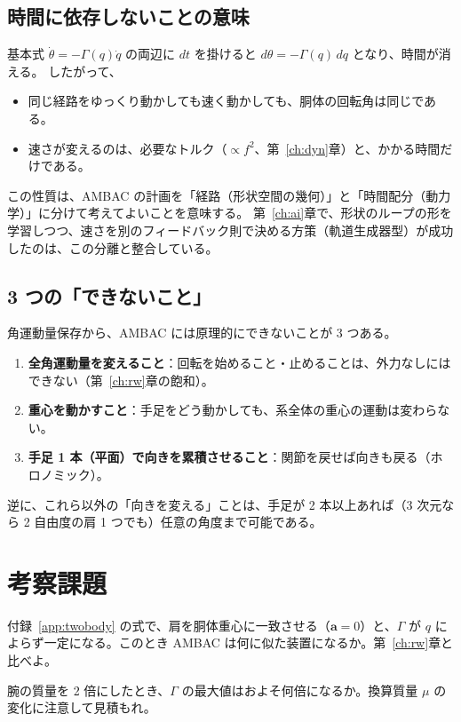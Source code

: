 \subsection{時間に依存しないことの意味}

基本式 $\dot\theta=-\Gamma(q)\dot q$ の両辺に $dt$ を掛けると $d\theta=-\Gamma(q)\,dq$ となり、時間が消える。
したがって、
\begin{itemize}
\item 同じ経路をゆっくり動かしても速く動かしても、胴体の回転角は同じである。
\item 速さが変えるのは、必要なトルク（$\propto f^2$、第~\ref{ch:dyn}章）と、かかる時間だけである。
\end{itemize}
この性質は、AMBAC の計画を「経路（形状空間の幾何）」と「時間配分（動力学）」に分けて考えてよいことを意味する。
第~\ref{ch:ai}章で、形状のループの形を学習しつつ、速さを別のフィードバック則で決める方策（軌道生成器型）が成功したのは、この分離と整合している。

\subsection{3 つの「できないこと」}

角運動量保存から、AMBAC には原理的にできないことが 3 つある。
\begin{enumerate}
\item \textbf{全角運動量を変えること}：回転を始めること・止めることは、外力なしにはできない（第~\ref{ch:rw}章の飽和）。
\item \textbf{重心を動かすこと}：手足をどう動かしても、系全体の重心の運動は変わらない。
\item \textbf{手足 1 本（平面）で向きを累積させること}：関節を戻せば向きも戻る（ホロノミック）。
\end{enumerate}
逆に、これら以外の「向きを変える」ことは、手足が 2 本以上あれば（3 次元なら 2 自由度の肩 1 つでも）任意の角度まで可能である。

\section*{考察課題}
\begin{exercise}
付録~\ref{app:twobody} の式で、肩を胴体重心に一致させる（$\bm a=0$）と、$\Gamma$ が $q$ によらず一定になる。このとき AMBAC は何に似た装置になるか。第~\ref{ch:rw}章と比べよ。
\end{exercise}
\begin{exercise}
腕の質量を 2 倍にしたとき、$\Gamma$ の最大値はおよそ何倍になるか。換算質量 $\mu$ の変化に注意して見積もれ。
\end{exercise}
